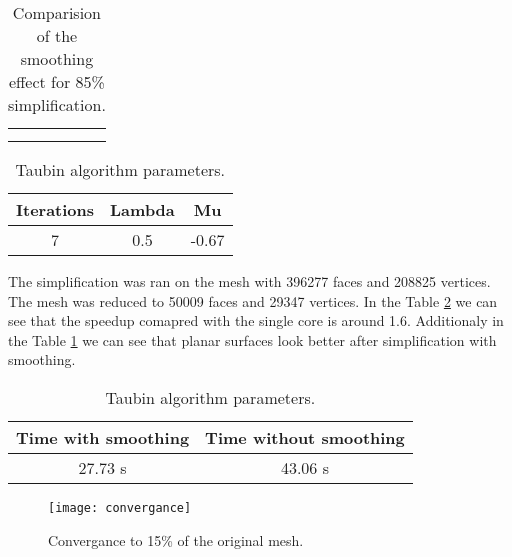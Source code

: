 \begin{center}
  	\begin{table}[h!]
  	\begin{center}
  	\begin{tabular}{cc}
	\begin{subfigure}{1\textwidth}\centering\includegraphics
		[width=0.8\columnwidth]{smooth}\caption{Simplification with smoothing}\label{smooth}\end{subfigure}\\
	\begin{subfigure}{1\textwidth}\centering\includegraphics
		[width=0.8\columnwidth]{non_smooth}\caption{Simplification without smoothing}\label{non_smooth}\end{subfigure}
	\end{tabular}
	\caption{Comparision of the smoothing effect for 85\% simplification.}
  	\label{tab:smoothing_effect}
  	\end{center}
	\end{table}
\end{center}

\begin{table}[h!]
\centering
\begin{tabular}{ |c|c|c| } 
 \hline
 Iterations & Lambda & Mu\\
 \hline
 7 & 0.5 & -0.67\\ 
 \hline
\end{tabular}
\caption{Taubin algorithm parameters.}
\end{table}

The simplification was ran on the mesh with 396277 faces and 208825 vertices. The mesh was reduced to 50009 faces and 29347 vertices. In the Table \ref{fig:time_speedup} we can see that the speedup comapred with the single core is around 1.6. Additionaly in the Table \ref{tab:smoothing_effect} we can see that planar surfaces look better after simplification with smoothing.

\begin{table}[h!]
\centering
\begin{tabular}{ |c|c| } 
 \hline
 Time with smoothing & Time without smoothing\\
 \hline
 27.73 s & 43.06 s\\ 
 \hline
\end{tabular}
\caption{Taubin algorithm parameters.}
\label{fig:time_speedup}
\end{table}

\begin{figure}[h!]
  \begin{center}
    \texttt{[image: convergance]}
    \caption{Convergance to 15\% of the original mesh.}
    \label{fig:convergance}
  \end{center}
\end{figure}

